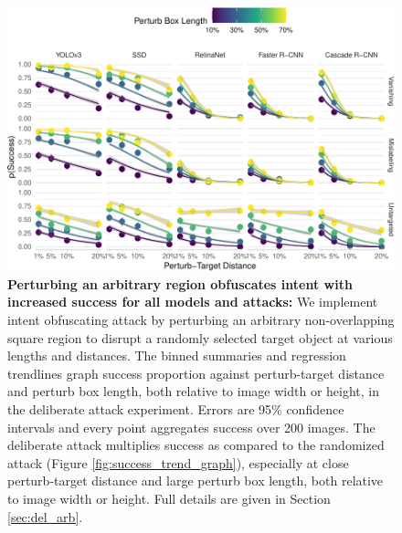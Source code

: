\begin{figure}[tb]

{\centering \includegraphics[width=1\linewidth]{imgs/arbitrary_trend_graph} 

}

\caption{\textbf{Perturbing an arbitrary region obfuscates intent with increased success for all models and attacks:}  We implement intent obfuscating attack by perturbing an arbitrary non-overlapping square region to disrupt a randomly selected target object at various lengths and distances. The binned summaries and regression trendlines graph success proportion against perturb-target distance and perturb box length, both relative to image width or height, in the deliberate attack experiment. Errors are 95\% confidence intervals and every point aggregates success over 200 images. The deliberate attack multiplies success as compared to the randomized attack (Figure \ref{fig:success_trend_graph}), especially at close perturb-target distance and large perturb box length, both relative to image width or height. Full details are given in Section \ref{sec:del_arb}.}\label{fig:arbitrary_trend_graph}
\end{figure}